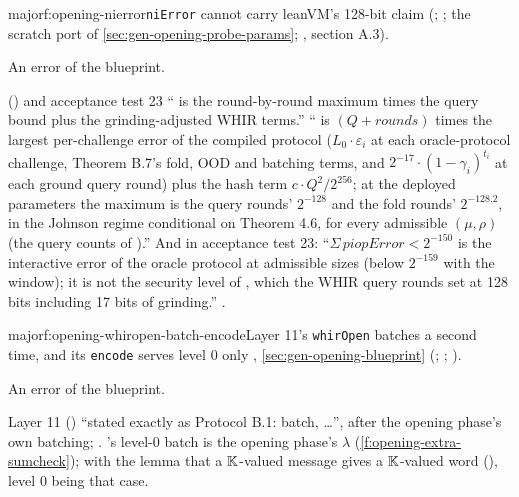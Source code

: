 \begin{finding}{major}{f:opening-nierror}{\texttt{niError} cannot carry leanVM's 128-bit claim}
 
(; ; the scratch port
of \cref{sec:gen-opening-probe-params}; , section A.3).

 An error of the blueprint.

\begin{change}{ () and acceptance test 23}
\asis `` is the round-by-round maximum times the query bound plus the
grinding-adjusted WHIR terms.''
\asproposed `` is $(Q + \mathit{rounds})$ times the largest per-challenge error of
the compiled protocol ($L_0·ε_i$ at each oracle-protocol challenge, Theorem B.7's fold, OOD and
batching terms, and $2^{−17}·(1 − γ_i)^{t_i}$ at each ground query round) plus the hash term
$c·Q^2/2^{256}$; at the deployed parameters the maximum is the query rounds' $2^{−128}$ and the fold
rounds' $2^{−128.2}$, in the Johnson regime conditional on Theorem 4.6, for every admissible
$(μ, ρ)$ (the query counts of ).'' And in acceptance test 23: ``$Σ\,\mathit{piopError} <
2^{-150}$ is the interactive error of the oracle protocol at admissible sizes (below $2^{-159}$ with
the window); it is not the security level of , which the WHIR query rounds set at 128
bits including 17 bits of grinding.''
\reason {}.
\end{change}
\end{finding}

\begin{finding}{major}{f:opening-whiropen-batch-encode}{Layer 11's \texttt{whirOpen} batches a second time, and its \texttt{encode} serves level 0 only}
 , \cref{sec:gen-opening-blueprint} (;
; ).

 An error of the blueprint.

\begin{change}{Layer 11 ()}
\asis {} ``stated exactly as Protocol B.1: batch, …'', after the opening phase's own
batching; .
\asproposed {}'s level-0 batch is the opening phase's $λ$
(\cref{f:opening-extra-sumcheck});  with
the lemma that a $\mathbb{K}$-valued message gives a $\mathbb{K}$-valued word (), level 0 being that case.
\end{change}
\end{finding}

